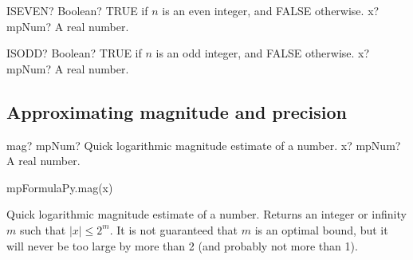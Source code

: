 
\begin{mpFunctionsExtract}
	\mpWorksheetFunctionOneNotImplemented
	{ISEVEN? Boolean? TRUE if $n$ is an even integer, and FALSE otherwise.}
	{x? mpNum? A real number.}
\end{mpFunctionsExtract}





\begin{mpFunctionsExtract}
	\mpWorksheetFunctionOneNotImplemented
	{ISODD? Boolean? TRUE if $n$ is an odd integer, and FALSE otherwise.}
	{x? mpNum? A real number.}
\end{mpFunctionsExtract}










\subsection{Approximating magnitude and precision}



\begin{mpFunctionsExtract}
	\mpFunctionOne
	{mag? mpNum? Quick logarithmic magnitude estimate of a number.}
	{x? mpNum? A real number.}
\end{mpFunctionsExtract}


mpFormulaPy.mag(x)

\vpara
Quick logarithmic magnitude estimate of a number. Returns an integer or infinity $m$ such that $|x|\leq 2^m$. It is not guaranteed that $m$ is an optimal bound, but it will never be too large by more than 2 (and probably not more than 1).

